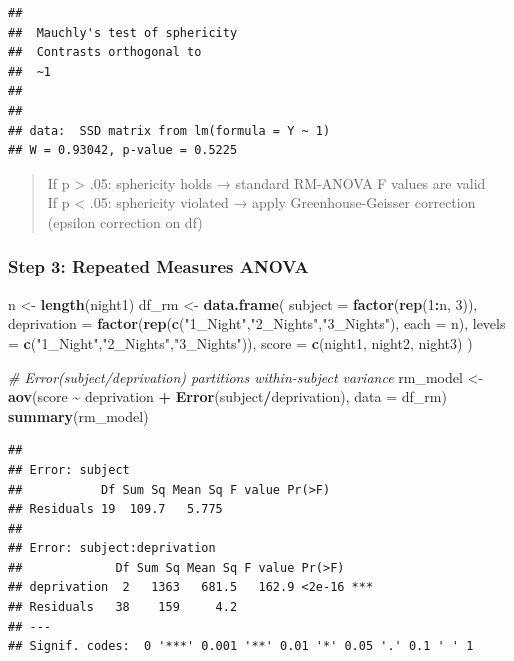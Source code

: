 \documentclass[
]{article}
\newenvironment{Shaded}{\begin{snugshade}}{\end{snugshade}}
\newcommand{\AttributeTok}[1]{\textcolor[rgb]{0.13,0.29,0.53}{#1}}
\newcommand{\CommentTok}[1]{\textcolor[rgb]{0.56,0.35,0.01}{\textit{#1}}}
\newcommand{\DecValTok}[1]{\textcolor[rgb]{0.00,0.00,0.81}{#1}}
\newcommand{\FunctionTok}[1]{\textcolor[rgb]{0.13,0.29,0.53}{\textbf{#1}}}
\newcommand{\NormalTok}[1]{#1}
\newcommand{\OtherTok}[1]{\textcolor[rgb]{0.56,0.35,0.01}{#1}}
\newcommand{\SpecialCharTok}[1]{\textcolor[rgb]{0.81,0.36,0.00}{\textbf{#1}}}
\newcommand{\StringTok}[1]{\textcolor[rgb]{0.31,0.60,0.02}{#1}}
\begin{document}
\begin{verbatim}
## 
##  Mauchly's test of sphericity
##  Contrasts orthogonal to
##  ~1
## 
## 
## data:  SSD matrix from lm(formula = Y ~ 1)
## W = 0.93042, p-value = 0.5225
\end{verbatim}

\begin{quote}
If p \textgreater{} .05: sphericity holds → standard RM-ANOVA F values
are valid\\
If p \textless{} .05: sphericity violated → apply Greenhouse-Geisser
correction (epsilon correction on df)
\end{quote}

\subsubsection{Step 3: Repeated Measures
ANOVA}\label{step-3-repeated-measures-anova}

\begin{Shaded}
\begin{Highlighting}[]
\NormalTok{n     }\OtherTok{\textless{}{-}} \FunctionTok{length}\NormalTok{(night1)}
\NormalTok{df\_rm }\OtherTok{\textless{}{-}} \FunctionTok{data.frame}\NormalTok{(}
  \AttributeTok{subject     =} \FunctionTok{factor}\NormalTok{(}\FunctionTok{rep}\NormalTok{(}\DecValTok{1}\SpecialCharTok{:}\NormalTok{n, }\DecValTok{3}\NormalTok{)),}
  \AttributeTok{deprivation =} \FunctionTok{factor}\NormalTok{(}\FunctionTok{rep}\NormalTok{(}\FunctionTok{c}\NormalTok{(}\StringTok{"1\_Night"}\NormalTok{,}\StringTok{"2\_Nights"}\NormalTok{,}\StringTok{"3\_Nights"}\NormalTok{), }\AttributeTok{each =}\NormalTok{ n),}
                       \AttributeTok{levels =} \FunctionTok{c}\NormalTok{(}\StringTok{"1\_Night"}\NormalTok{,}\StringTok{"2\_Nights"}\NormalTok{,}\StringTok{"3\_Nights"}\NormalTok{)),}
  \AttributeTok{score       =} \FunctionTok{c}\NormalTok{(night1, night2, night3)}
\NormalTok{)}

\CommentTok{\# Error(subject/deprivation) partitions within{-}subject variance}
\NormalTok{rm\_model }\OtherTok{\textless{}{-}} \FunctionTok{aov}\NormalTok{(score }\SpecialCharTok{\textasciitilde{}}\NormalTok{ deprivation }\SpecialCharTok{+} \FunctionTok{Error}\NormalTok{(subject}\SpecialCharTok{/}\NormalTok{deprivation), }\AttributeTok{data =}\NormalTok{ df\_rm)}
\FunctionTok{summary}\NormalTok{(rm\_model)}
\end{Highlighting}
\end{Shaded}

\begin{verbatim}
## 
## Error: subject
##           Df Sum Sq Mean Sq F value Pr(>F)
## Residuals 19  109.7   5.775               
## 
## Error: subject:deprivation
##             Df Sum Sq Mean Sq F value Pr(>F)    
## deprivation  2   1363   681.5   162.9 <2e-16 ***
## Residuals   38    159     4.2                   
## ---
## Signif. codes:  0 '***' 0.001 '**' 0.01 '*' 0.05 '.' 0.1 ' ' 1
\end{verbatim}
\end{document}
